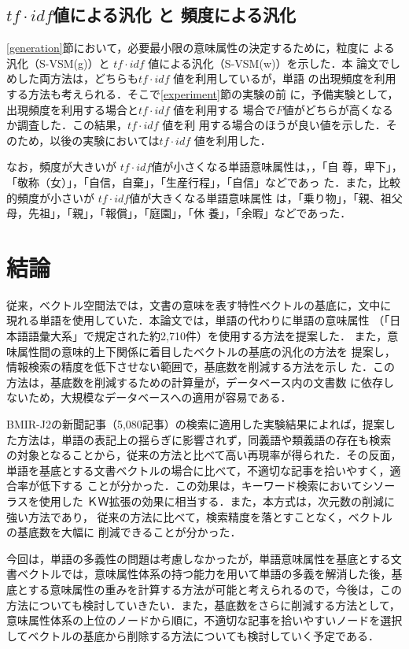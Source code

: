 \subsection{ $tf \cdot idf$値による汎化 と 頻度による汎化}

\ref{generation}節において，必要最小限の意味属性の決定するために，粒度に
よる汎化（S-VSM(g)）と $tf \cdot idf$ 値による汎化（S-VSM(w)）を示した．本
論文でしめした両方法は，どちらも$tf \cdot idf$ 値を利用しているが，単語
の出現頻度を利用する方法も考えられる．そこで\ref{experiment}節の実験の前
に，予備実験として，出現頻度を利用する場合と$tf \cdot idf$ 値を利用する
場合で$F$値がどちらが高くなるか調査した．この結果，$tf \cdot idf$ 値を利
用する場合のほうが良い値を示した．そのため，以後の実験においては$tf
\cdot idf$ 値を利用した．

なお，頻度が大きいが $tf \cdot idf$値が小さくなる単語意味属性は，，「自
尊，卑下」，「敬称（女）」，「自信，自棄」，「生産行程」，「自信」などであっ
た．また，比較的頻度が小さいが $tf \cdot idf$値が大きくなる単語意味属性
は，「乗り物」，「親、祖父母，先祖」，「親」，「報償」，「庭園」，「休
養」，「余暇」などであった．

\section{結論}

従来，ベクトル空間法では，文書の意味を表す特性ベクトルの基底に，文中に
現れる単語を使用していた．本論文では，単語の代わりに単語の意味属性
（「日本語語彙大系」で規定された約2,710件）を使用する方法を提案した．
また，意味属性間の意味的上下関係に着目したベクトルの基底の汎化の方法を
提案し，情報検索の精度を低下させない範囲で，基底数を削減する方法を示し
た．この方法は，基底数を削減するための計算量が，データベース内の文書数
に依存しないため，大規模なデータベースへの適用が容易である．

BMIR-J2の新聞記事（5,080記事）の検索に適用した実験結果によれば，提案し
た方法は，単語の表記上の揺らぎに影響されず，同義語や類義語の存在も検索
の対象となることから，従来の方法と比べて高い再現率が得られた．その反面，
単語を基底とする文書ベクトルの場合に比べて，不適切な記事を拾いやすく，適合率が低下する
ことが分かった．この効果は，キーワード検索においてシソーラスを使用した
ＫＷ拡張の効果に相当する．また，本方式は，次元数の削減に強い方法であり，
従来の方法に比べて，検索精度を落とすことなく，ベクトルの基底数を大幅に
削減できることが分かった．

今回は，単語の多義性の問題は考慮しなかったが，単語意味属性を基底とする文
書ベクトルでは，意味属性体系の持つ能力を用いて単語の多義を解消した後，基
底とする意味属性の重みを計算する方法が可能と考えられるので，今後は，この
方法についても検討していきたい．また，基底数をさらに削減する方法として，
意味属性体系の上位のノードから順に，不適切な記事を拾いやすいノードを選択
してベクトルの基底から削除する方法についても検討していく予定である．






